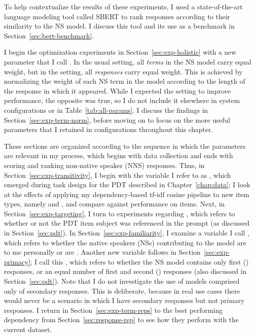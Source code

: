 To help contextualize the results of these experiments, I used a state-of-the-art language modeling tool called SBERT to rank responses according to their similarity to the NS model. I discuss this tool and its use as a benchmark in Section~\ref{sec:bert-benchmark}.

I begin the optimization experiments in Section~\ref{sec:exp-holistic} with a new parameter that I call . In the usual  setting, all \textit{terms} in the NS model carry equal weight, but in the  setting, all \textit{responses} carry equal weight. This is achieved by normalizing the weight of each NS term in the model according to the length of the response in which it appeared. While I expected the  setting to improve performance, the opposite was true, so I do not include it elsewhere in system configurations or in Table~\ref{tab:all-params}. I discuss the findings in Section~\ref{sec:exp-term-norm}, before moving on to focus on the more useful parameters that I retained in configurations throughout this chapter.

These sections are organized according to the sequence in which the parameters are relevant in my process, which begins with data collection and ends with scoring and ranking non-native speaker (NNS) responses. Thus, in Section~\ref{sec:exp-transitivity}, I begin with the variable I refer to as , which emerged during task design for the PDT described in Chapter~\ref{chap:data}; I look at the effects of applying my dependency-based tf-idf cosine pipeline to new item types, namely  and , and compare against performance on  items. Next, in Section~\ref{sec:exp-targeting}, I turn to experiments regarding , which refers to whether or not the PDT item subject was referenced in the prompt (as discussed in Section~\ref{sec:pdt}). In Section~\ref{sec:exp-familiarity}, I examine a variable I call , which refers to whether the native speakers (NSs) contributing to the model are  to me personally or are . Another new variable follows in Section~\ref{sec:exp-primacy}; I call this , which refers to whether the NS model contains only first () responses, or an equal number of first and second () responses (also discussed in Section~\ref{sec:pdt}). Note that I do not investigate the use of models comprised only of secondary responses. This is deliberate, because in real use cases there would never be a scenario in which I have secondary responses but not primary responses. I return in Section~\ref{sec:exp-term-reps} to the best performing dependency  from Section~\ref{sec:response-rep} to see how they perform with the current dataset.

